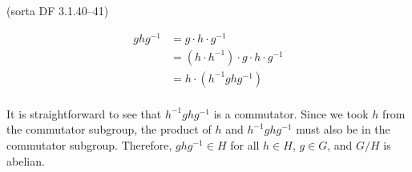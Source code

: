 \begin{problem}{(\textsf{sorta DF 3.1.40--41})}
\begin{enumalph}
\begin{Answer}
      \begin{align*}
        ghg^{-1} &= g \cdot h \cdot g^{-1} \\
        &= (h \cdot h^{-1}) \cdot g \cdot h \cdot g^{-1} \\
        &= h \cdot (h^{-1}ghg^{-1}) \\
      \end{align*}

      It is straightforward to see that $h^{-1}ghg^{-1}$ is a commutator.
      Since we took $h$ from the commutator subgroup,
      the product of $h$ and $h^{-1}ghg^{-1}$
      must also be in the commutator subgroup.
      Therefore, $ghg^{-1} \in H$ for all $h \in H$, $g \in G$, and $G/H$ is abelian.
    \end{Answer}
  \end{enumalph}
\end{problem}
